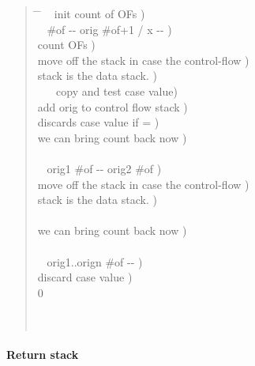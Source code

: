\begin{quote}\ttfamily
  \begin{tabbing}
	\tab \= \hspace{10em} \=    ~  init count of OFs ) \\[2\parskip]

	\+ \word{:} ~  \#of -{}- orig \#of+1 / x -{}- ) \\
							\>  count OFs ) \\
							\>  move off the stack in case the control-flow ) \\
									\>  stack is the data stack. ) \\
		 ~  \word{=}~
								 copy and test case value) \\
		 	\>  add orig to control flow stack ) \\
		 	\>  discards case value if = ) \\
	\-					\>  we can bring count back now ) \\
	\word{;}  \\[2\parskip]

	\+ \word{:} ~  orig1 \#of -{}- orig2 \#of ) \\
							\>  move off the stack in case the control-flow ) \\
									\>  stack is the data stack. ) \\
		  \\
	\-					\>  we can bring count back now ) \\
	\word{;}  \\[2\parskip]

	\+ \word{:} ~  orig1..orign \#of -{}- ) \\
		 	\>  discard case value ) \\
		0  \\
		\tab {}  \\
	\-  \\
	\word{;} 
  \end{tabbing}
\end{quote}

\paragraph{Return stack} ~ %

